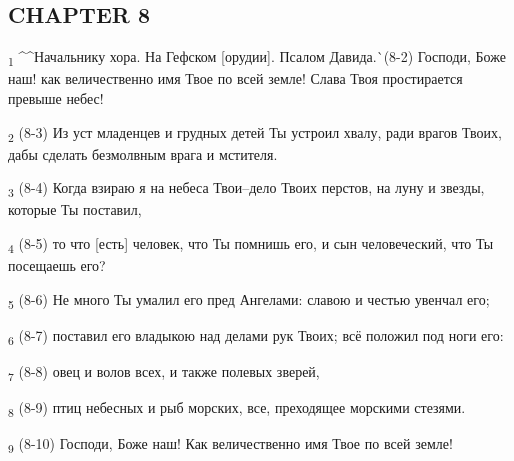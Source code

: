 \subsection{CHAPTER 8}
\begin{tcolorbox}
\textsubscript{1} ^^Начальнику хора. На Гефском [орудии]. Псалом Давида.^^ (8-2) Господи, Боже наш! как величественно имя Твое по всей земле! Слава Твоя простирается превыше небес!
\end{tcolorbox}
\begin{tcolorbox}
\textsubscript{2} (8-3) Из уст младенцев и грудных детей Ты устроил хвалу, ради врагов Твоих, дабы сделать безмолвным врага и мстителя.
\end{tcolorbox}
\begin{tcolorbox}
\textsubscript{3} (8-4) Когда взираю я на небеса Твои--дело Твоих перстов, на луну и звезды, которые Ты поставил,
\end{tcolorbox}
\begin{tcolorbox}
\textsubscript{4} (8-5) то что [есть] человек, что Ты помнишь его, и сын человеческий, что Ты посещаешь его?
\end{tcolorbox}
\begin{tcolorbox}
\textsubscript{5} (8-6) Не много Ты умалил его пред Ангелами: славою и честью увенчал его;
\end{tcolorbox}
\begin{tcolorbox}
\textsubscript{6} (8-7) поставил его владыкою над делами рук Твоих; всё положил под ноги его:
\end{tcolorbox}
\begin{tcolorbox}
\textsubscript{7} (8-8) овец и волов всех, и также полевых зверей,
\end{tcolorbox}
\begin{tcolorbox}
\textsubscript{8} (8-9) птиц небесных и рыб морских, все, преходящее морскими стезями.
\end{tcolorbox}
\begin{tcolorbox}
\textsubscript{9} (8-10) Господи, Боже наш! Как величественно имя Твое по всей земле!
\end{tcolorbox}
